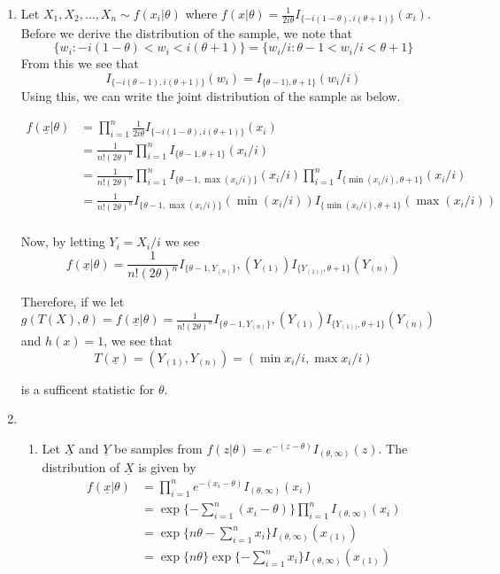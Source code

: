 \documentclass[12pt]{article}  %
\begin{document}
\begin{enumerate}
\item Let $X_1, X_2, \ldots, X_n \sim f(x_i|\theta)$ where $f(x|\theta) = \frac{1}{2i\theta}I_{\{-i(1-\theta), i(\theta + 1)\}}(x_i)$. Before we derive the distribution of the sample, we note that $$\{w_i: -i(1-\theta)<w_i <i(\theta + 1)\} = \{w_i/i: \theta-1<w_i/i<\theta + 1\}$$ From this we see that $$I_{\{-i(\theta-1), i(\theta + 1)\}}(w_i) = I_{\{\theta-1),\theta + 1\}}(w_i/i)$$ Using this, we can write the joint distribution of the sample as below. 

\begin{align*}
f(\underline{x}|\theta) &= \prod_{i=1}^{n}\frac{1}{2i\theta}I_{\{-i(1-\theta), i(\theta + 1)\}}(x_i)\\
&=\frac{1}{n!(2\theta)^n}\prod_{i=1}^{n}I_{\{\theta-1, \theta + 1\}}(x_i/i)\\
&=\frac{1}{n!(2\theta)^n}\prod_{i=1}^{n}I_{\{\theta-1, \max(x_i/i)\}}(x_i/i)\prod_{i=1}^{n}I_{\{\min(x_i/i), \theta + 1\}}(x_i/i)\\
&=\frac{1}{n!(2\theta)^n}I_{\{\theta-1, \max(x_i/i)\}}(\min(x_i/i))I_{\{\min(x_i/i), \theta + 1\}}(\max(x_i/i))\\
\end{align*}

Now, by letting $Y_i = X_i/i$ we see $$f(\underline{x}|\theta) = \frac{1}{n!(2\theta)^n}I_{\{\theta-1, Y_{(n)}\}},(Y_{(1)})I_{\{Y_{(1))}, \theta + 1\}}(Y_{(n)})$$

Therefore, if we let $g(T(X),\theta) = f(\underline{x}|\theta) = \frac{1}{n!(2\theta)^n}I_{\{\theta-1, Y_{(n)}\}},(Y_{(1)})I_{\{Y_{(1))}, \theta + 1\}}(Y_{(n)})$ and $h(x) = 1$, we see that $$T(\underline{x}) = (Y_{(1)}, Y_{(n)}) = (\min x_i/i, \max x_i/i)$$

is a sufficent statistic for $\theta$. 

\item 
\begin{enumerate}

\item Let $\underline{X}$ and $\underline{Y}$ be samples from $f(z|\theta) = e^{-(z-\theta)}I_{(\theta, \infty)}(z)$. The distribution of $\underline{X}$ is given by 
\begin{align*}
f(\underline{x}|\theta) &= \prod_{i=1}^{n} e^{-(x_i-\theta)}I_{(\theta, \infty)}(x_i)\\
&= \exp\{-\sum_{i=1}^{n}(x_i - \theta)\}\prod_{i=1}^{n}I_{(\theta, \infty)}(x_i)\\
&=\exp\{n\theta - \sum_{i=1}^{n}x_i\}I_{(\theta,\infty)}(x_{(1)})\\
&=\exp\{n\theta\}\exp\{-\sum_{i=1}^{n}x_i\}I_{(\theta,\infty)}(x_{(1)})
\end{align*}


\end{enumerate}
\end{enumerate}
\end{document}
